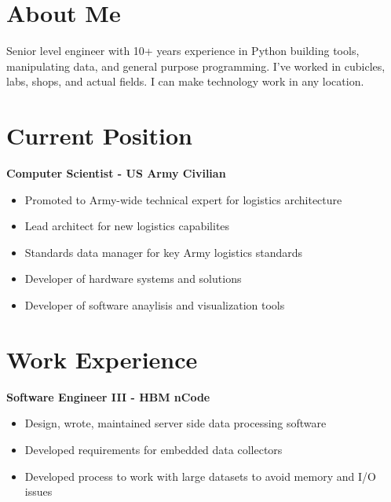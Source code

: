 \documentclass[a4paper,10pt]{article}
\begin{document}
\begin{adjustbox}{valign=t}
\begin{minipage}{0.6\textwidth} %

\section*{About Me}

	\raggedright
	Senior level engineer with 10+ years experience in Python building tools, manipulating data, and general purpose programming. I've worked in cubicles, labs, shops, and actual fields. I can make technology work in any location.
\section*{Current Position}
\begin{description}
\raggedright
\item[\normalfont \textcolor{ColorOne}{Sep. 2016 - Present}] \textbf{Computer Scientist - US Army Civilian}\\ \medskip
\begin{itemize}[align=right, itemindent=-1.5em,leftmargin=0pt]
	\item Promoted to Army-wide technical expert for logistics architecture
	\item Lead architect for new logistics capabilites
	\item Standards data manager for key Army logistics standards
	\item Developer of hardware systems and solutions
	\item Developer of software anaylisis and visualization tools
\end{itemize}
\end{description}

\section*{Work Experience}
\begin{description}
\raggedright
\item[\normalfont \textcolor{ColorOne}{Feb. 2014 - Sep. 2016}] \textbf{Software Engineer III - HBM nCode} \\ \medskip

\begin{itemize}[align=right, itemindent=-1.5em,leftmargin=0pt]
	\item Design, wrote, maintained server side data processing software
	\item Developed requirements for embedded data collectors
	\item Developed process to work with large datasets to avoid memory and I/O issues
\end{itemize}



\end{description}
\end{minipage}
\end{adjustbox}
\end{document}
